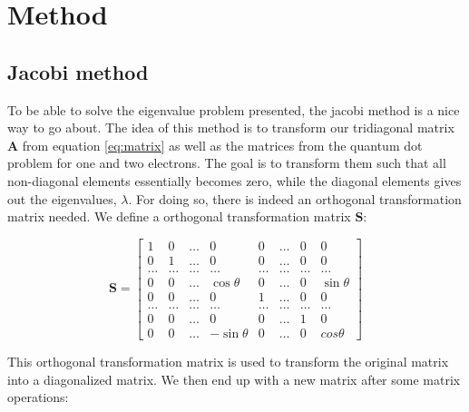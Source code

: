 \documentclass[twoside,onecolumn]{article}
\begin{document}
\section{Method}

\subsection{Jacobi method}

To be able to solve the eigenvalue problem presented, the jacobi method is a nice way to go about. The idea of this method is to transform our tridiagonal matrix $\mathbf{A}$ from equation \ref{eq:matrix} as well as the matrices from the quantum dot problem for one and two electrons. The goal is to transform them such that all non-diagonal elements essentially becomes zero, while the diagonal elements gives out the eigenvalues, $\lambda$. For doing so, there is indeed an orthogonal transformation matrix needed. We define a orthogonal transformation matrix $\mathbf{S}$:

\bigskip

\begin{equation}
    \mathbf{S} = \begin{bmatrix}   1& 0 & \dots  & 0    & 0  & \dots & 0   & 0 \\
                                0& 1 & \dots  & 0    & 0  & \dots & 0   & 0 \\
                                \dots& \dots & \dots  & \dots   & \dots  & \dots& \dots& \dots  \\
                                0& 0 & \dots  & \cos\theta   & 0  & \dots & 0   & \sin\theta \\
                                0& 0 & \dots  & 0    & 1  & \dots & 0   & 0 \\
				   \dots & \dots  & \dots  & \dots   & \dots  & \dots & \dots   & \dots \\
                                0& 0 & \dots  & 0    & 0  & \dots & 1   & 0\\
                                0& 0 & \dots  & -\sin\theta  & 0  & \dots & 0  & cos\theta 
    \end{bmatrix} 
\end{equation}

\bigskip

This orthogonal transformation matrix is used to transform the original matrix into a diagonalized matrix. We then end up with a new matrix after some matrix operations: 

\bigskip
\end{document}
